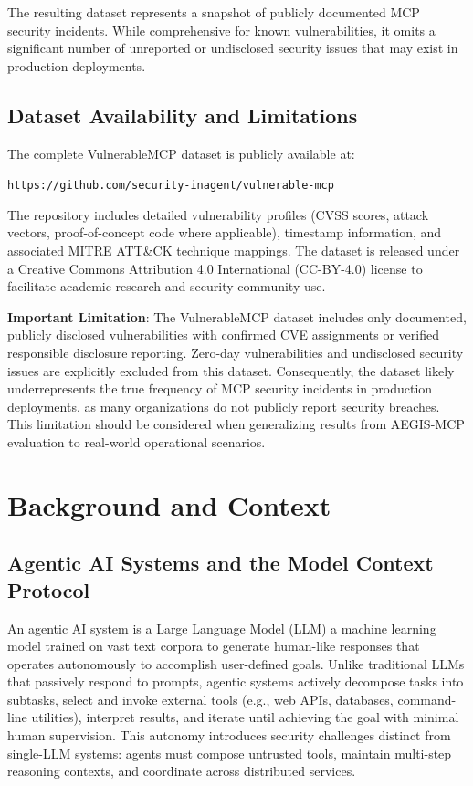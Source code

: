 \documentclass[12pt,twocolumn,journal]{IEEEtran}
\begin{document}
The resulting dataset represents a snapshot of publicly documented MCP security incidents. While comprehensive for known vulnerabilities, it omits a significant number of unreported or undisclosed security issues that may exist in production deployments.

\subsection{Dataset Availability and Limitations}

The complete VulnerableMCP dataset is publicly available at:

\begin{center}
\texttt{https://github.com/security-inagent/vulnerable-mcp}
\end{center}

The repository includes detailed vulnerability profiles (CVSS scores, attack vectors, proof-of-concept code where applicable), timestamp information, and associated MITRE ATT\&CK technique mappings. The dataset is released under a Creative Commons Attribution 4.0 International (CC-BY-4.0) license to facilitate academic research and security community use.

\textbf{Important Limitation}: The VulnerableMCP dataset includes only documented, publicly disclosed vulnerabilities with confirmed CVE assignments or verified responsible disclosure reporting. Zero-day vulnerabilities and undisclosed security issues are explicitly excluded from this dataset. Consequently, the dataset likely underrepresents the true frequency of MCP security incidents in production deployments, as many organizations do not publicly report security breaches. This limitation should be considered when generalizing results from AEGIS-MCP evaluation to real-world operational scenarios.

\section{Background and Context}
\label{sec:background}

\subsection{Agentic AI Systems and the Model Context Protocol}

An agentic AI system is a Large Language Model (LLM) a machine learning model trained on vast text corpora to generate human-like responses that operates autonomously to accomplish user-defined goals. Unlike traditional LLMs that passively respond to prompts, agentic systems actively decompose tasks into subtasks, select and invoke external tools (e.g., web APIs, databases, command-line utilities), interpret results, and iterate until achieving the goal with minimal human supervision. This autonomy introduces security challenges distinct from single-LLM systems: agents must compose untrusted tools, maintain multi-step reasoning contexts, and coordinate across distributed services.
\end{document}
